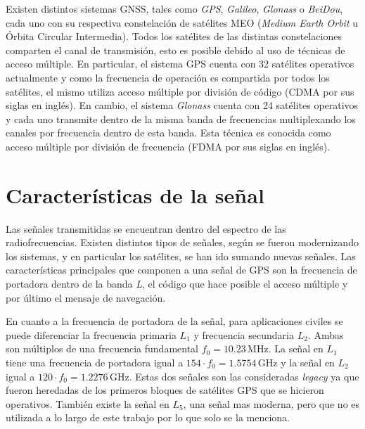 \documentclass[a4paper,12pt,oneside,onecolumn,final,openright]{book}%
\begin{document}
	Existen distintos sistemas GNSS, tales como \textit{GPS}, \textit{Galileo}, \textit{Glonass} o \textit{BeiDou}, cada uno con su respectiva constelación de satélites MEO (\textit{Medium Earth Orbit} u Órbita Circular Intermedia). Todos los satélites de las distintas constelaciones comparten el canal de transmisión, esto es posible debido al uso de técnicas de acceso múltiple. En particular, el sistema GPS cuenta con 32 satélites operativos actualmente y como la frecuencia de operación es compartida por todos los satélites, el mismo utiliza acceso múltiple por división de código (CDMA por sus siglas en inglés). En cambio, el sistema \textit{Glonass} cuenta con 24 satélites operativos y cada uno transmite dentro de la misma banda de frecuencias multiplexando los canales por frecuencia dentro de esta banda. Esta técnica es conocida como acceso múltiple por división de frecuencia (FDMA por sus siglas en inglés).
	
\section{Características de la señal}\label{sec:senial}
	Las señales transmitidas se encuentran dentro del espectro de las radiofrecuencias. Existen distintos tipos de señales, según se fueron modernizando los sistemas, y en particular los satélites, se han ido sumando nuevas señales. Las características principales que componen a una señal de GPS son la frecuencia de portadora dentro de la banda \textit{L}, el código que hace posible el acceso múltiple y por último el mensaje de navegación.
	
	En cuanto a la frecuencia de portadora de la señal, para aplicaciones civiles se puede diferenciar la frecuencia primaria $L_1$ y frecuencia secundaria $L_2$. Ambas son múltiplos de una frecuencia fundamental $f_0=10.23$\,MHz. La señal en $L_1$ tiene una frecuencia de portadora igual a $154\cdot f_0 = 1.5754$\,GHz y la señal en $L_2$ igual a $120\cdot f_0 = 1.2276$\,GHz. Estas dos señales son las consideradas \textit{legacy} ya que fueron heredadas de los primeros bloques de satélites GPS que se hicieron operativos. También existe la señal en $L_5$, una señal mas moderna, pero que no es utilizada a lo largo de este trabajo por lo que solo se la menciona.
	
\end{document}
